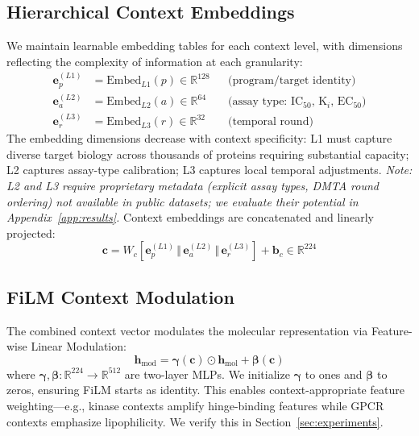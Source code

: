 \documentclass[sigconf]{acmart}
\newcommand{\hmol}{\mathbf{h}_{\text{mol}}}
\newcommand{\hmod}{\mathbf{h}_{\text{mod}}}
\begin{document}
\subsection{Hierarchical Context Embeddings}

We maintain learnable embedding tables for each context level, with dimensions reflecting the complexity of information at each granularity:
\begin{align}
    \mathbf{e}_p^{(L1)} &= \text{Embed}_{L1}(p) \in \mathbb{R}^{128} && \text{(program/target identity)} \\
    \mathbf{e}_a^{(L2)} &= \text{Embed}_{L2}(a) \in \mathbb{R}^{64} && \text{(assay type: IC$_{50}$, K$_i$, EC$_{50}$)} \\
    \mathbf{e}_r^{(L3)} &= \text{Embed}_{L3}(r) \in \mathbb{R}^{32} && \text{(temporal round)}
\end{align}
The embedding dimensions decrease with context specificity: L1 must capture diverse target biology across thousands of proteins requiring substantial capacity; L2 captures assay-type calibration; L3 captures local temporal adjustments. \textit{Note: L2 and L3 require proprietary metadata (explicit assay types, DMTA round ordering) not available in public datasets; we evaluate their potential in Appendix~\ref{app:results}.} Context embeddings are concatenated and linearly projected:
\begin{equation}
    \mathbf{c} = W_c [\mathbf{e}_p^{(L1)} \,\Vert\, \mathbf{e}_a^{(L2)} \,\Vert\, \mathbf{e}_r^{(L3)}] + \mathbf{b}_c \in \mathbb{R}^{224}
\end{equation}

\subsection{FiLM Context Modulation}

The combined context vector modulates the molecular representation via Feature-wise Linear Modulation:
\begin{equation}
    \hmod = \boldsymbol{\gamma}(\mathbf{c}) \odot \hmol + \boldsymbol{\beta}(\mathbf{c})
    \label{eq:film}
\end{equation}
where $\boldsymbol{\gamma}, \boldsymbol{\beta}: \mathbb{R}^{224} \rightarrow \mathbb{R}^{512}$ are two-layer MLPs. We initialize $\boldsymbol{\gamma}$ to ones and $\boldsymbol{\beta}$ to zeros, ensuring FiLM starts as identity. This enables context-appropriate feature weighting---e.g., kinase contexts amplify hinge-binding features while GPCR contexts emphasize lipophilicity. We verify this in Section~\ref{sec:experiments}.
\end{document}

